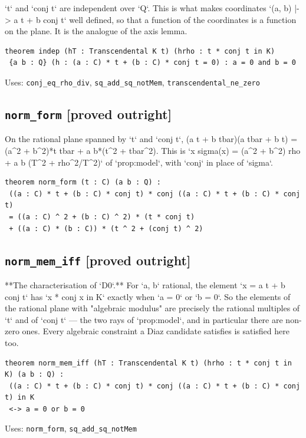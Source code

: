 \documentclass[11pt,a4paper]{article}
\newcommand{\tagpr}{\textcolor{provedc}{\textbf{[proved outright]}}}
\begin{document}
`t` and `conj t` are independent over `Q`. This is what makes coordinates `(a, b) |-> a t + b conj t` well defined, so that a function of the coordinates is a function on the plane. It is the analogue of the axis lemma.

\begin{lstlisting}
theorem indep (hT : Transcendental K t) (hrho : t * conj t in K)
 {a b : Q} (h : (a : C) * t + (b : C) * conj t = 0) : a = 0 and b = 0
\end{lstlisting}
\noindent\footnotesize Uses: \texttt{conj\_eq\_rho\_div}, \texttt{sq\_add\_sq\_notMem}, \texttt{transcendental\_ne\_zero}\normalsize


\subsection*{\texttt{norm\_form} \hfill \tagpr}

On the rational plane spanned by `t` and `conj t`, (a t + b tbar)(a tbar + b t) = (a\^{}2 + b\^{}2)*t tbar + a b*(t\^{}2 + tbar\^{}2). This is `x sigma(x) = (a\^{}2 + b\^{}2) rho + a b (T\^{}2 + rho\^{}2/T\^{}2)` of `prop:model`, with `conj` in place of `sigma`.

\begin{lstlisting}
theorem norm_form (t : C) (a b : Q) :
 ((a : C) * t + (b : C) * conj t) * conj ((a : C) * t + (b : C) * conj t)
 = ((a : C) ^ 2 + (b : C) ^ 2) * (t * conj t)
 + ((a : C) * (b : C)) * (t ^ 2 + (conj t) ^ 2)
\end{lstlisting}

\subsection*{\texttt{norm\_mem\_iff} \hfill \tagpr}

**The characterisation of `D0`.** For `a, b` rational, the element `x = a t + b conj t` has `x * conj x in K` exactly when `a = 0` or `b = 0`. So the elements of the rational plane with "algebraic modulus" are precisely the rational multiples of `t` and of `conj t` --- the two rays of `prop:model`, and in particular there are non-zero ones. Every algebraic constraint a Diaz candidate satisfies is satisfied here too.

\begin{lstlisting}
theorem norm_mem_iff (hT : Transcendental K t) (hrho : t * conj t in K) (a b : Q) :
 ((a : C) * t + (b : C) * conj t) * conj ((a : C) * t + (b : C) * conj t) in K
 <-> a = 0 or b = 0
\end{lstlisting}
\noindent\footnotesize Uses: \texttt{norm\_form}, \texttt{sq\_add\_sq\_notMem}\normalsize
\end{document}

